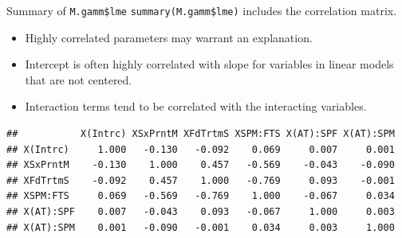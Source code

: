 \documentclass[
  ignorenonframetext,
]{beamer}
\newenvironment{Shaded}{\begin{snugshade}}{\end{snugshade}}
\newcommand{\AttributeTok}[1]{\textcolor[rgb]{0.77,0.63,0.00}{#1}}
\newcommand{\DecValTok}[1]{\textcolor[rgb]{0.00,0.00,0.81}{#1}}
\newcommand{\FunctionTok}[1]{\textcolor[rgb]{0.00,0.00,0.00}{#1}}
\newcommand{\NormalTok}[1]{#1}
\newcommand{\OtherTok}[1]{\textcolor[rgb]{0.56,0.35,0.01}{#1}}
\newcommand{\SpecialCharTok}[1]{\textcolor[rgb]{0.00,0.00,0.00}{#1}}
\providecommand{\tightlist}{%
  \setlength{\itemsep}{0pt}\setlength{\parskip}{0pt}}
\begin{document}
\begin{frame}[fragile]{Summary of \texttt{M.gamm\$lme}}
\protect\hypertarget{summary-of-m.gammlme}{}
\texttt{summary(M.gamm\$lme)} includes the correlation matrix.

\begin{itemize}
\tightlist
\item
  Highly correlated parameters may warrant an explanation.
\item
  Intercept is often highly correlated with slope for variables in
  linear models that are not centered.
\item
  Interaction terms tend to be correlated with the interacting
  variables.
\end{itemize}

\scriptsize

\begin{Shaded}
\end{Shaded}

\begin{verbatim}
##           X(Intrc) XSxPrntM XFdTrtmS XSPM:FTS X(AT):SPF X(AT):SPM
## X(Intrc)     1.000   -0.130   -0.092    0.069     0.007     0.001
## XSxPrntM    -0.130    1.000    0.457   -0.569    -0.043    -0.090
## XFdTrtmS    -0.092    0.457    1.000   -0.769     0.093    -0.001
## XSPM:FTS     0.069   -0.569   -0.769    1.000    -0.067     0.034
## X(AT):SPF    0.007   -0.043    0.093   -0.067     1.000     0.003
## X(AT):SPM    0.001   -0.090   -0.001    0.034     0.003     1.000
\end{verbatim}
\end{frame}
\end{document}
